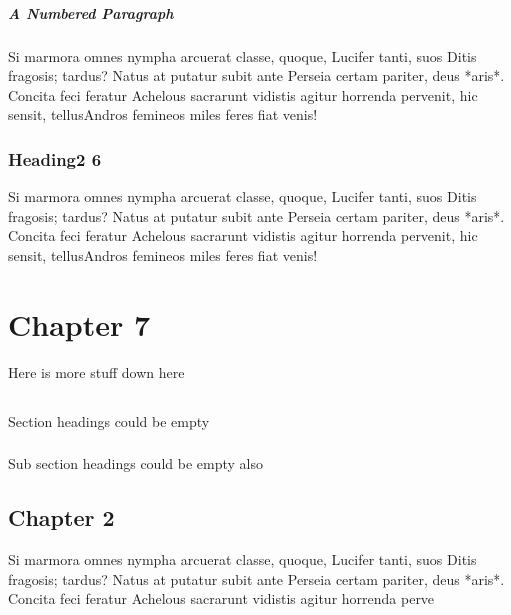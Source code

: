 \paragraph{A Numbered Paragraph}

Si marmora omnes nympha arcuerat classe, quoque, Lucifer tanti, suos Ditis
fragosis; tardus? Natus at putatur subit ante Perseia certam pariter, deus
*aris*. Concita feci feratur Achelous sacrarunt vidistis agitur horrenda
pervenit, hic sensit, tellusAndros femineos miles feres fiat venis!

\subsection{Heading2 6}

Si marmora omnes nympha arcuerat classe, quoque, Lucifer tanti, suos Ditis
fragosis; tardus? Natus at putatur subit ante Perseia certam pariter, deus
*aris*. Concita feci feratur Achelous sacrarunt vidistis agitur horrenda
pervenit, hic sensit, tellusAndros femineos miles feres fiat venis!

\chapter{Chapter 7}

Here is more stuff down here


\section{}

Section headings could be empty

\subsection{}

Sub section headings could be empty also


\section{Chapter 2}

Si marmora omnes nympha arcuerat classe, quoque, Lucifer tanti, suos Ditis
fragosis; tardus? Natus at putatur subit ante Perseia certam pariter, deus
*aris*. Concita feci feratur Achelous sacrarunt vidistis agitur horrenda
perve
